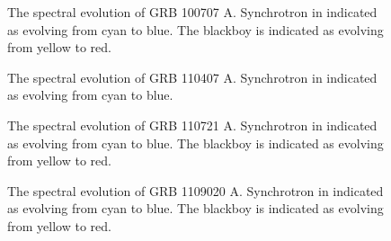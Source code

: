 \begin{figure}[h]
  \centering
  \caption{The spectral evolution of GRB 100707 A. Synchrotron in
    indicated as evolving from cyan to blue. The blackboy is indicated
    as evolving from yellow to red.}
  \label{fig:specEvoGRB5}
\end{figure}

\begin{figure}[h]
  \centering
  \caption{The spectral evolution of GRB 110407 A. Synchrotron in
    indicated as evolving from cyan to blue.}
  \label{fig:specEvoGRB6}
\end{figure}

\begin{figure}[h]
  \centering
  \caption{The spectral evolution of GRB 110721 A. Synchrotron in
    indicated as evolving from cyan to blue. The blackboy is indicated
    as evolving from yellow to red.}
  \label{fig:specEvoGRB7}
\end{figure}

\begin{figure}[h]
  \centering
  \caption{The spectral evolution of GRB 1109020 A. Synchrotron in
    indicated as evolving from cyan to blue. The blackboy is indicated
    as evolving from yellow to red.}
  \label{fig:specEvoGRB8}
\end{figure}



